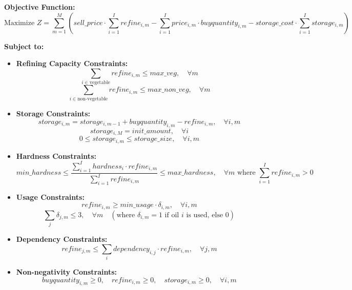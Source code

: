 \documentclass{article}
\begin{document}
\textbf{Objective Function:}
\[
\text{Maximize } Z = \sum_{m=1}^{M} \left( sell\_price \cdot \sum_{i=1}^{I} refine_{i,m} - \sum_{i=1}^{I} price_{i,m} \cdot buyquantity_{i,m} - storage\_cost \cdot \sum_{i=1}^{I} storage_{i,m} \right)
\]

\textbf{Subject to:}
\begin{itemize}
    \item \textbf{Refining Capacity Constraints:}
    \[
    \sum_{i \in \text{vegetable}} refine_{i,m} \leq max\_veg, \quad \forall m
    \]
    \[
    \sum_{i \in \text{non-vegetable}} refine_{i,m} \leq max\_non\_veg, \quad \forall m
    \]

    \item \textbf{Storage Constraints:}
    \[
    storage_{i,m} = storage_{i,m-1} + buyquantity_{i,m} - refine_{i,m}, \quad \forall i, m
    \]
    \[
    storage_{i,M} = init\_amount, \quad \forall i
    \]
    \[
    0 \leq storage_{i,m} \leq storage\_size, \quad \forall i, m
    \]

    \item \textbf{Hardness Constraints:}
    \[
    min\_hardness \leq \frac{\sum_{i=1}^{I} hardness_i \cdot refine_{i,m}}{\sum_{i=1}^{I} refine_{i,m}} \leq max\_hardness, \quad \forall m \text{ where } \sum_{i=1}^{I} refine_{i,m} > 0
    \]

    \item \textbf{Usage Constraints:}
    \[
    refine_{i,m} \geq min\_usage \cdot \delta_{i,m}, \quad \forall i, m
    \]
    \[
    \sum_{j} \delta_{j,m} \leq 3, \quad \forall m \quad (\text{where } \delta_{i,m} = 1 \text{ if oil } i \text{ is used, else } 0)
    \]

    \item \textbf{Dependency Constraints:}
    \[
    refine_{j,m} \leq \sum_{i} dependency_{i,j} \cdot refine_{i,m}, \quad \forall j, m
    \]

    \item \textbf{Non-negativity Constraints:}
    \[
    buyquantity_{i,m} \geq 0, \quad refine_{i,m} \geq 0, \quad storage_{i,m} \geq 0, \quad \forall i, m
    \]

\end{itemize}
\end{document}
